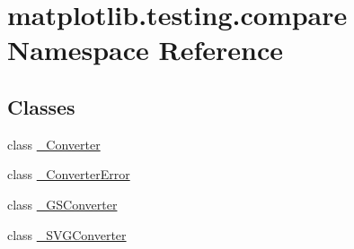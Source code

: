 \hypertarget{namespacematplotlib_1_1testing_1_1compare}{}\section{matplotlib.\+testing.\+compare Namespace Reference}
\label{namespacematplotlib_1_1testing_1_1compare}
\subsection*{Classes}
\begin{DoxyCompactItemize}
\item 
class \hyperlink{classmatplotlib_1_1testing_1_1compare_1_1__Converter}{\+\_\+\+Converter}
\item 
class \hyperlink{classmatplotlib_1_1testing_1_1compare_1_1__ConverterError}{\+\_\+\+Converter\+Error}
\item 
class \hyperlink{classmatplotlib_1_1testing_1_1compare_1_1__GSConverter}{\+\_\+\+G\+S\+Converter}
\item 
class \hyperlink{classmatplotlib_1_1testing_1_1compare_1_1__SVGConverter}{\+\_\+\+S\+V\+G\+Converter}
\end{DoxyCompactItemize}
